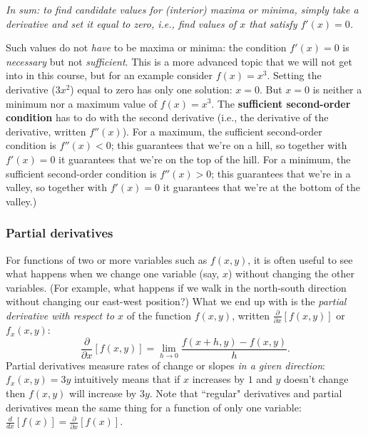 \begin{CALCULUS}
\bigskip

\noindent \emph{In sum: to find candidate values for (interior) maxima or minima, simply take a derivative and set it equal to zero, i.e., find values of $x$ that satisfy $f'(x)=0$.}

\bigskip

Such values do not \emph{have} to be maxima or minima: the condition $f'(x)=0$ is \emph{necessary} but not \emph{sufficient}. This is a more advanced topic that we will not get into in this course, but for an example consider $f(x)=x^3$. Setting the derivative ($3x^2$) equal to zero has only one solution: $x=0$. But $x=0$ is neither a minimum nor a maximum value of $f(x)=x^3$. The \textbf{sufficient second-order condition} has to do with the second derivative (i.e., the derivative of the derivative, written $f''(x)$). For a maximum, the sufficient second-order condition is $f''(x)<0$; this guarantees that we're on a hill, so together with $f'(x)=0$ it guarantees that we're on the top of the hill.  For a minimum, the sufficient second-order condition is $f''(x)>0$; this guarantees that we're in a valley, so together with $f'(x)=0$ it guarantees that we're at the bottom of the valley.)

\subsubsection*{Partial derivatives}

For functions of two or more variables such as $f(x,y)$, it is often useful to see what happens when we change one variable (say, $x$) without changing the other variables. (For example, what happens if we walk in the north-south direction without changing our east-west position?) What we end up with is the \emph{partial derivative with respect to $x$} of the function $f(x,y)$, written $\displaystyle \frac{\partial}{\partial x}\left[ f(x,y)\right]$ or $f_x(x,y)$:
\[
\frac{\partial}{\partial x}\left[ f(x,y)\right] = \lim_{h\rightarrow 0} \frac{f(x+h, y) - f(x,y)}{h}.
\]
%
Partial derivatives measure rates of change or slopes \emph{in a given direction}: $f_x(x,y)=3y$ intuitively means that if $x$ increases by $1$ and $y$ doesn't change then $f(x,y)$ will increase by $3y$. Note that ``regular" derivatives and partial derivatives mean the same thing for a function of only one variable: $\displaystyle \frac{d}{dx}[f(x)] = \frac{\partial}{\partial x}[f(x)]$.


\end{CALCULUS}

